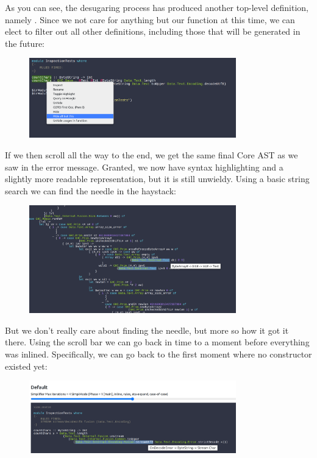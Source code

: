 As you can see, the desugaring process has produced another top-level definition, namely . Since we
not care for anything but our  function at this time, we can elect to filter out all other definitions,
including those that will be generated in the future: 

\begin{figure}[H]
\centering
\includegraphics[width=0.8\textwidth]{figs/countchars_hideallbut.png}
\label{fig:countchars_3}
\end{figure}

If we then scroll all the way to the end, we get the same final Core AST as we saw in the error message. Granted,
we now have syntax highlighting and a slightly more readable representation, but it is still unwieldy. Using
a basic string search we can find the needle in the haystack:

\begin{figure}[H]
\centering
\includegraphics[width=0.8\textwidth]{figs/countchars_3.png}
\end{figure}

But we don't really care about finding the needle, but more so how it got it there.
Using the scroll bar we can go back in time to a moment before everything was inlined.
Specifically, we can go back to the first moment where no  constructor existed yet:

\begin{figure}[H]
\centering
\includegraphics[width=0.8\textwidth]{figs/countchars_4.png}
\end{figure}

